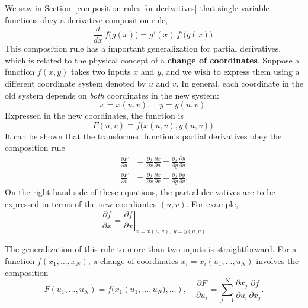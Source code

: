 \documentclass[10pt,a4paper]{article}
\begin{document}
We saw in Section~\ref{composition-rules-for-derivatives} that
single-variable functions obey a derivative composition rule,
\begin{equation}
  \frac{d}{dx}\, f\big(g(x)\big) = g'(x) \, f'\big(g(x)\big).
\end{equation}
This composition rule has a important generalization for partial
derivatives, which is related to the physical concept of a
\textbf{change of coordinates}. Suppose a function $f(x,y)$ takes two
inputs $x$ and $y$, and we wish to express them using a different
coordinate system denoted by $u$ and $v$. In general, each coordinate
in the old system depends on \emph{both} coordinates in the new
system:
\begin{equation}
  x = x(u,v), \quad y = y(u,v).
\end{equation}
Expressed in the new coordinates, the function is
\begin{equation}
  F(u,v) \equiv f\big(x(u,v), y(u,v)\big).
\end{equation}
It can be shown that the transformed function's partial derivatives obey
the composition rule
\begin{align}
  \frac{\partial F}{\partial u} &= \frac{\partial f}{\partial x} \frac{\partial x}{\partial u} + \frac{\partial f}{\partial y} \frac{\partial y}{\partial u}\\
  \frac{\partial F}{\partial v} &= \frac{\partial f}{\partial x} \frac{\partial x}{\partial v} + \frac{\partial f}{\partial y} \frac{\partial y}{\partial v}.
\end{align}
On the right-hand side of these equations, the partial derivatives are
to be expressed in terms of the new coordiantes $(u,v)$. For example,
\begin{equation}
  \frac{\partial f}{\partial x} = \left.\frac{\partial f}{\partial x}\right|_{x = x(u,v), \;y= y(u,v)}
\end{equation}

The generalization of this rule to more than two inputs is
straightforward. For a function $f(x_1, \dots, x_N)$, a change of
coordinates $x_i = x_i(u_1, \dots, u_N)$ involves the composition
\begin{equation}
F(u_1, \dots, u_N) = f\big(x_1(u_1,\dots,u_N\big), \dots), \quad \frac{\partial F}{\partial u_i} = \sum_{j=1}^N \frac{\partial x_j}{\partial u_i} \frac{\partial f}{\partial x_j}.
\end{equation}
\end{document}
